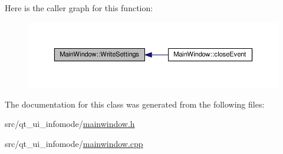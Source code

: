 Here is the caller graph for this function\+:
\nopagebreak
\begin{figure}[H]
\begin{center}
\leavevmode
\includegraphics[width=350pt]{class_main_window_a56a5e4d5e0a022e8c1ecf350d2916ade_icgraph}
\end{center}
\end{figure}




The documentation for this class was generated from the following files\+:\begin{DoxyCompactItemize}
\item 
src/qt\+\_\+ui\+\_\+infomode/\hyperlink{mainwindow_8h}{mainwindow.\+h}\item 
src/qt\+\_\+ui\+\_\+infomode/\hyperlink{mainwindow_8cpp}{mainwindow.\+cpp}\end{DoxyCompactItemize}
